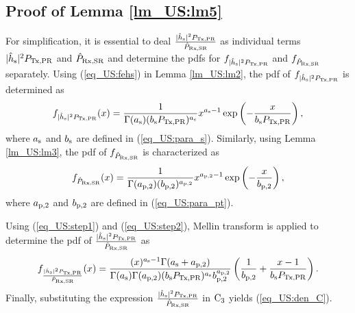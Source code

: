\subsection{Proof of Lemma \ref{lm_US:lm5}} \label{ap:one}
\begin{IEEEproof}
For simplification, it is essential to deal $\frac{|\hat{h}_{\text{s}}|^2 P_{\text{Tx,PR}}}{\hat{P}_{\text{Rx,SR}}}$ as individual terms $|\hat{h}_{\text{s}}|^2 P_{\text{Tx,PR}}$ and $\hat{P}_{\text{Rx,SR}}$ and determine the pdfs for $f_{|\hat{h}_{\text{s}}|^2 P_{\text{Tx,PR}}}$ and $f_{\hat{P}_{\text{Rx,SR}}}$ separately.
Using (\ref{eq_US:fehs}) in Lemma \ref{lm_US:lm2}, the pdf of $f_{|\hat{h}_{\text{s}}|^2 P_{\text{Tx,PR}}}$ is determined as
\begin{align}
f_{|\hat{h}_{\text{s}}|^2 P_{\text{Tx,PR}}}(x) = \frac{1}{\Gamma(a_{\text{s}}) (b_{\text{s}} P_{\text{Tx,PR}})^{a_{\text{s}}}} x^{a_{\text{s}} - 1} \exp\left( - \frac{x}{ b_{\text{s}} P_{\text{Tx,PR}}} \right), \label{eq_US:step1} 
\end{align}
where $a_{\text{s}}$ and $b_{\text{s}}$ are defined in (\ref{eq_US:para_s}).
Similarly, using Lemma \ref{lm_US:lm3}, the pdf of $f_{\hat{P}_{\text{Rx,SR}}}$ is characterized as
\begin{align}
f_{\hat{P}_{\text{Rx,SR}}}(x) = \frac{1}{\Gamma(a_{\text{p,2}}) (b_{\text{p,2}})^{a_{\text{p,2}}}} x^{a_{\text{p,2}} - 1} \exp\left( - \frac{x}{ b_{\text{p,2}}} \right), \label{eq_US:step2} 
\end{align}
where $a_{\text{p,2}}$ and $b_{\text{p,2}}$ are defined in (\ref{eq_US:para_pt}).

Using (\ref{eq_US:step1}) and (\ref{eq_US:step2}), Mellin transform \cite{NIST} is applied to determine the pdf of $\frac{|\hat{h}_{\text{s}}|^2 P_{\text{Tx,PR}}}{\hat{P}_{\text{Rx,SR}}}$ as
\begin{align}
f_{\frac{|\hat{h}_{\text{s}}|^2 P_{\text{Tx,PR}}}{\hat{P}_{\text{Rx,SR}}}}(x) = \frac{(x)^{a_{\text{s}} - 1} \Gamma(a_{\text{s}} + a_{\text{p,2}})}{\Gamma(a_{\text{s}}) \Gamma(a_{\text{p,2}}) (b_{\text{s}} P_{\text{Tx,PR}}) ^{a_{\text{s}}} b_{\text{p,2}}^{a_{\text{p,2}}}} \left(\frac{1}{b_{\text{p,2}}} + \frac{x - 1}{b_{\text{s}} P_{\text{Tx,PR}}}\right).
\end{align}
Finally, substituting the expression $\frac{|\hat{h}_{\text{s}}|^2 P_{\text{Tx,PR}}}{\hat{P}_{\text{Rx,SR}}}$ in $\text{C}_{\text{3}}$ yields (\ref{eq_US:den_C}).
\end{IEEEproof}
